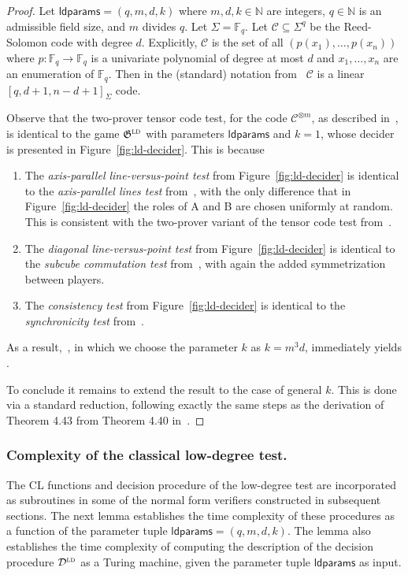 \documentclass[11pt]{article}
\theoremstyle{definition}
\newcommand{\code}{\mathcal{C}}
\newcommand{\N}{\ensuremath{\mathbb{N}}}
\newcommand{\F}{\ensuremath{\mathbb{F}}}
\newcommand{\ld}{\textsc{ld}}
\newcommand{\game}{\mathfrak{G}}
\newcommand{\decider}{\mathcal{D}}
\newcommand{\ldc}{k}
\newcommand{\ldparams}{\mathsf{ldparams}}
\begin{document}
\begin{proof}
Let $\ldparams = (q, m, d, \ldc)$
where $m, d, \ldc \in \N$ are integers, $q \in \N$ is an admissible field size,
and $m$ divides $q$. Let $\Sigma=\F_q$. Let $\code \subseteq \Sigma^q$ be the Reed-Solomon code with degree $d$. Explicitly, $\code$ is the set of all $(p(x_1),\ldots,p(x_n))$ where $p:\F_q\to\F_q$ is a univariate polynomial of degree at most $d$ and $x_1,\ldots,x_n$ are an enumeration of $\F_q$. Then in the (standard) notation from~\cite{ji2021quantum} $\code$ is a linear $[q,d+1,n-d+1]_\Sigma$ code.

Observe that the two-prover tensor code test, for the code $\code^{\otimes m}$, as described in~\cite[Figure 1 and Figure 2]{ji2021quantum}, is identical to the game $\game^\ld$ with parameters $\ldparams$ and $\ldc=1$, whose decider is presented in Figure~\ref{fig:ld-decider}. This is because 
\begin{enumerate}
\item The \emph{axis-parallel line-versus-point test} from Figure~\ref{fig:ld-decider} is identical to the \emph{axis-parallel lines test} from~\cite[Figure 1]{ji2021quantum}, with the only difference that in Figure~\ref{fig:ld-decider} the roles of A and B are chosen uniformly at random. This is consistent with the two-prover variant of the tensor code test from~\cite[Section 4.1]{ji2021quantum}.
\item The \emph{diagonal line-versus-point test} from Figure~\ref{fig:ld-decider} is identical to the \emph{subcube commutation test} from~\cite[Figure 1]{ji2021quantum}, with again the added symmetrization between players. 
\item The \emph{consistency test} from Figure~\ref{fig:ld-decider} is identical to the \emph{synchronicity test} from~\cite[Figure 2]{ji2021quantum}.
\end{enumerate}

As a result,~\cite[Theorem 4.7]{ji2021quantum}, in which we choose the parameter $k$ as $k=m^3d$,  immediately yields .

To conclude it remains to extend the result to the case of general $\ldc$. This is done 
via a standard reduction, following exactly the same steps as the derivation of Theorem 4.43 from Theorem 4.40 in~\cite{NW19}.
\end{proof}






\subsubsection{Complexity of the classical low-degree test.}
The CL functions and decision procedure of the low-degree test are incorporated
as subroutines in some of the normal form verifiers constructed in subsequent
sections.
The next lemma establishes the time complexity of these procedures as a function
of the parameter tuple $\ldparams = (q,m,d,k)$.
The lemma also establishes the time complexity of computing the {description} of
the decision procedure $\decider^\ld$ as a Turing machine, given the parameter
tuple $\ldparams$ as input.
\end{document}
